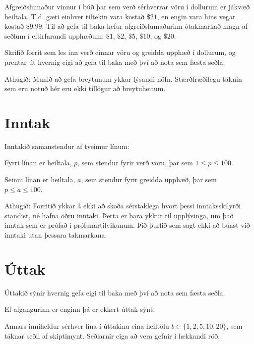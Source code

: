 
\noindent
Afgreiðslumaður vinnur í búð þar sem verð sérhverrar vöru í dollurum er jákvæð heiltala.
T.d. gæti einhver tiltekin vara kostað $\$21$, en engin vara hins vegar kostað $\$9.99$. 
Til að gefa til baka hefur afgreiðslumaðurinn ótakmarkað magn af seðlum í eftirfarandi upphæðum: 
$\$1$, $\$2$, $\$5$, $\$10$, og $\$20$.

Skrifið forrit sem les inn verð einnar vöru og greidda upphæð í dollurum,
og prentar út hvernig eigi að gefa til baka með því að nota sem fæsta seðla.

Athugið: Munið að gefa breytunum ykkar lýsandi nöfn.
Stærðfræðilegu táknin sem eru notuð hér eru ekki tillögur að breytuheitum.

\section*{Inntak}
Inntakið samanstendur af tveimur línum:

Fyrri línan er heiltala, $p$, sem stendur fyrir verð vöru, þar sem $1 \leq p \leq 100$.

Seinni línan er heiltala, $a$, sem stendur fyrir greidda upphæð, þar sem $p \leq a \leq 100$.

Athugið: Forritið ykkar á ekki að skoða sérstaklega hvort þessi inntaksskilyrði standist, né hafna öðru inntaki.
Þetta er bara ykkur til upplýsinga, um það inntak sem er prófað í prófunartilvikunum.
Þið þurfið sem sagt ekki að búast við inntaki utan þessara takmarkana.

\section*{Úttak}
Úttakið sýnir hvernig gefa eigi til baka með því að nota sem fæsta seðla.

Ef afgangurinn er enginn þá er ekkert úttak sýnt.

Annars inniheldur sérhver lína í úttakinu eina heiltölu
$b \in \{1, 2, 5, 10, 20\}$,
sem táknar seðil af skiptimynt.
Seðlarnir eiga að vera gefnir í lækkandi röð.
